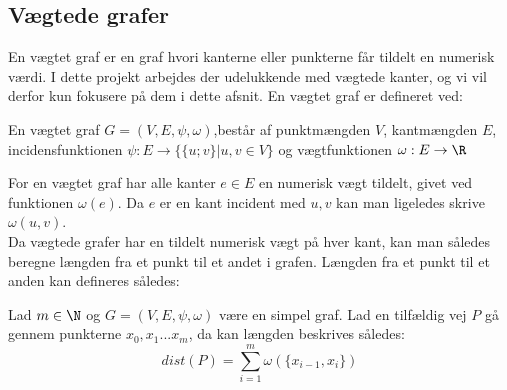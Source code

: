 \subsection{Vægtede grafer}
En vægtet graf er en graf hvori kanterne eller punkterne får tildelt en numerisk værdi. I dette projekt arbejdes der udelukkende med vægtede kanter, og vi vil derfor kun fokusere på dem i dette afsnit.
En vægtet graf er defineret ved:
\begin{defn}
En vægtet graf $G=(V,E,\psi,\omega)$,består af punktmængden $V$, kantmængden $E$, incidensfunktionen $\psi: E \rightarrow \{\{u;v\}|u,v \in V\}$ og vægtfunktionen $\omega: E \rightarrow \R$
\end{defn}
For en vægtet graf har alle kanter $e\in E$ en numerisk vægt tildelt, givet ved funktionen $\omega (e)$. Da $e$ er en kant incident med ${u,v}$ kan man  ligeledes skrive $\omega (u,v)$.
\\ Da vægtede grafer har en tildelt numerisk vægt på hver kant, kan man således beregne længden fra et punkt til et andet i grafen. Længden fra et punkt til et anden kan defineres således:
\begin{defn}
Lad $m\in \N$ og $G=(V,E,\psi,\omega)$ være en simpel graf. Lad en tilfældig vej $P$ gå gennem punkterne $x_0,x_1...x_m$, da kan længden beskrives således:
	\begin{equation}
	dist(P)=\sum_{i=1}^{m}\omega(\{x_{i-1},x_i\})
	\end{equation}  
\end{defn}

